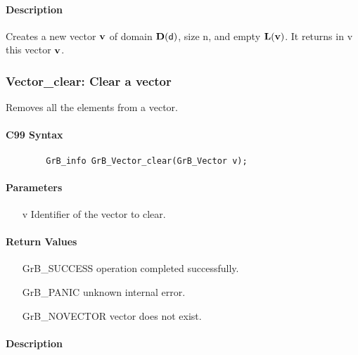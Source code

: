 \paragraph{Description}

Creates a new vector ${\bf v}$ of domain $\bold{D}({\sf d})$, size {\sf n}, and
empty $\bold{L}({\bf v})$. It returns in {\sf v} this vector ${\bf v}$.

\subsubsection{{\sf Vector\_clear}: Clear a vector}

Removes all the elements from a vector.

\paragraph{C99 Syntax}

\begin{verbatim}
        GrB_info GrB_Vector_clear(GrB_Vector v);
\end{verbatim}

\paragraph{Parameters}

\begin{itemize}[leftmargin=1.1in]
    \item[{\sf v}] Identifier of the vector to clear.
\end{itemize}

\paragraph{Return Values}

\begin{itemize}[leftmargin=2.1in]
\item[{\sf GrB\_SUCCESS}]   operation completed successfully.
\item[{\sf GrB\_PANIC}]     unknown internal error.
\item[{\sf GrB\_NOVECTOR}]  vector does not exist.
\end{itemize}

\paragraph{Description}

